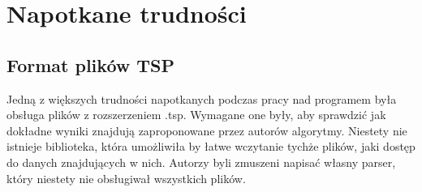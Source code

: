 \section{Napotkane trudności}

\subsection{Format plików TSP}

Jedną z większych trudności napotkanych podczas pracy nad programem 
była obsługa plików z rozszerzeniem .tsp. Wymagane one były, aby sprawdzić
jak dokładne wyniki znajdują zaproponowane przez autorów algorytmy. Niestety
nie istnieje biblioteka, która umożliwiła by łatwe wczytanie tychże plików, 
jaki dostęp do danych znajdujących w nich. Autorzy byli zmuszeni napisać własny
parser, który niestety nie obsługiwał wszystkich plików. 
